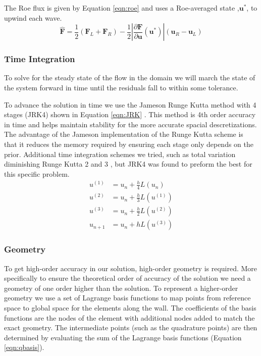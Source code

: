 \documentclass{article}
\begin{document}
	The Roe flux is given by Equation \ref{eqn:roe} and uses a Roe-averaged state ,$\mathbf{u}^{*}$, to upwind each wave.
	\begin{equation}
		\hat{\mathbf{F}}=\frac{1}{2}\left(\mathbf{F}_{L}+\mathbf{F}_{R}\right)-\frac{1}{2}\left|\frac{\partial \mathbf{F}}{\partial \mathbf{u}}\left(\mathbf{u}^{*}\right)\right|\left(\mathbf{u}_{R}-\mathbf{u}_{L}\right)
		\label{eqn:roe}
	\end{equation}

	\subsubsection{Time Integration}
	To solve for the steady state of the flow in the domain we will march the state of the system forward in time until the residuals fall to within some tolerance.

	To advance the solution in time we use the Jameson Runge Kutta method with 4 stages (JRK4) shown in Equation \ref{eqn:JRK} .
	This method is 4th order accuracy in time and helps maintain stability for the more accurate spacial descretizations.
	The advantage of the Jameson implementation of the Runge Kutta scheme is that it reduces the memory required by ensuring each stage only depends on the prior.
	Additional time integration schemes we tried, such as total variation diminishing Runge Kutta 2 and 3 , but JRK4 was found to preform the best for this specific problem.
	\begin{equation}
	\begin{aligned} u^{(1)} &=u_{n}+\frac{h}{4} L\left(u_{n}\right) \\ u^{(2)} &=u_{n}+\frac{h}{3} L\left(u^{(1)}\right) \\ u^{(3)} &=u_{n}+\frac{h}{2} L\left(u^{(2)}\right) \\ u_{n+1} &=u_{n}+h L\left(u^{(3)}\right) \end{aligned}
		\label{eqn:JRK}
	\end{equation}



	\subsubsection{Geometry}

	To get high-order accuracy in our solution, high-order geometry is required.
	More specifically to ensure the theoretical order of accuracy of the solution we need a geometry of one order higher than the solution.
	To represent a higher-order geometry we use a set of Lagrange basis functions to map points from reference space to global space for the elements along the wall.
	The coefficients of the basis functions are the nodes of the element with additional nodes added to match the exact geometry.
	The intermediate points (such as the quadrature points) are then determined by evaluating the sum of the Lagrange basis functions (Equation \ref{eqn:qbasis}).
\end{document}
